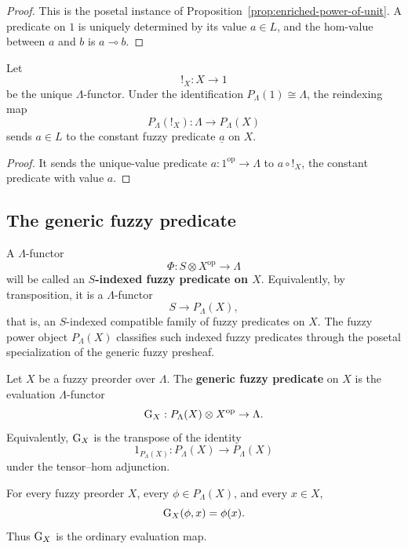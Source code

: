 \begin{proof}
    This is the posetal instance of Proposition~\ref{prop:enriched-power-of-unit}. A predicate on \(1\) is uniquely determined by its value \(a\in L\), and the hom-value between \(a\) and \(b\) is \(a\multimap b\).
\end{proof}

\begin{corollary}
\label{cor:constant-predicates-by-reindexing}
    Let
    \[
        !_X:X\to 1
    \]
    be the unique \(\Lambda\)-functor. Under the identification \(P_\Lambda(1)\cong\Lambda\), the reindexing map
    \[
        P_\Lambda(!_X):\Lambda\to P_\Lambda(X)
    \]
    sends \(a\in L\) to the constant fuzzy predicate \(\underline{a}\) on
    \(X\).
\end{corollary}

\begin{proof}
    It sends the unique-value predicate \(a:1^{\mathrm{op}}\to\Lambda\) to \(a\circ !_X\), the constant predicate with value \(a\).
\end{proof}

\subsection{The generic fuzzy predicate}
\label{subsec:the-generic-fuzzy-predicate}

A \(\Lambda\)-functor
\[
    \Phi:S\otimes X^{\mathrm{op}}\to \Lambda
\]
will be called an \textbf{\(S\)-indexed fuzzy predicate on \(X\)}. Equivalently, by transposition, it is a \(\Lambda\)-functor
\[
    S\to P_\Lambda(X),
\]
that is, an \(S\)-indexed compatible family of fuzzy predicates on \(X\). The fuzzy power object \(P_\Lambda(X)\) classifies such indexed fuzzy predicates through the posetal specialization of the generic fuzzy presheaf.

\begin{definition}
\label{def:generic-fuzzy-predicate}
    Let \(X\) be a fuzzy preorder over \(\Lambda\). The \textbf{generic fuzzy predicate} on \(X\) is the evaluation \(\Lambda\)-functor
    \[
        \operatorname{G}_X:P_\Lambda(X)\otimes X^{\mathrm{op}}\to \Lambda.
    \]
    Equivalently, \(\operatorname{G}_X\) is the transpose of the identity
    \[
        1_{P_\Lambda(X)}:P_\Lambda(X)\to P_\Lambda(X)
    \]
    under the tensor--hom adjunction.
\end{definition}

\begin{proposition}
\label{prop:generic-fuzzy-predicate-is-evaluation}
    For every fuzzy preorder \(X\), every \(\phi\in P_\Lambda(X)\), and every \(x\in X\),
    \[
        \operatorname{G}_X(\phi,x)=\phi(x).
    \]
    Thus \(\operatorname{G}_X\) is the ordinary evaluation map.
\end{proposition}

